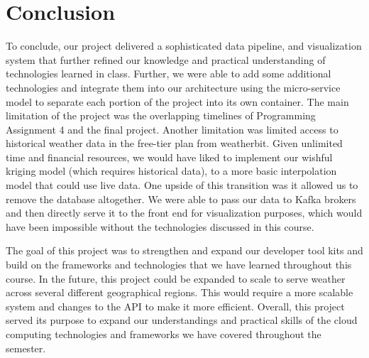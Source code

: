 \section{Conclusion}
To conclude, our project delivered a sophisticated data pipeline, and visualization system that further refined our knowledge and practical understanding of technologies learned in class. 
Further, we were able to add some additional technologies and integrate them into our architecture using the micro-service model to separate each portion of the project into its own container. 
The main limitation of the project was the overlapping timelines of Programming Assignment 4 and the final project.
Another limitation was limited access to historical weather data in the free-tier plan from weatherbit.
Given unlimited time and financial resources, we would have liked to implement our wishful kriging model (which requires historical data), to a more basic interpolation model that could use live data. 
One upside of this transition was it allowed us to remove the database altogether. We were able to pass our data to Kafka brokers and then directly serve it to the front end for visualization purposes, which would have been impossible without the technologies discussed in this course.

The goal of this project was to strengthen and expand our developer tool kits and build on the frameworks and technologies that we have learned throughout this course.
In the future, this project could be expanded to scale to serve weather across several different geographical regions. This would require a more scalable system and changes to the API to make it more efficient. Overall, this project served its purpose to expand our understandings and practical skills of the cloud computing technologies and frameworks we have covered throughout the semester. 